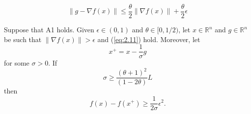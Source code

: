 \documentclass[10pt,a4paper]{amsart}
\begin{document}
\begin{equation}
\|g-\nabla f(x)\|\leq\dfrac{\theta}{2}\|\nabla f(x)\|+\dfrac{\theta}{2}\epsilon
\label{eq:2.11}
\end{equation}

\begin{lemma}
\label{lem:2.3}
Suppose that A1 holds. Given $\epsilon\in (0,1)$ and $\theta\in [0,1/2)$, let $x\in\mathbb{R}^{n}$ and $g\in\mathbb{R}^{n}$ be such that $\|\nabla f(x)\|>\epsilon$ and (\ref{eq:2.11}) hold. Moreover, let 
\begin{equation*}
x^{+}=x-\frac{1}{\sigma}g
\end{equation*}
for some $\sigma>0$. If 
\begin{equation}
\sigma\geq\dfrac{(\theta +1)^{2}}{(1-2\theta)}L
\label{eq:2.12}
\end{equation}
then
\begin{equation}
f(x)-f(x^{+})\geq\dfrac{1}{2\sigma}\epsilon^{2}.
\label{eq:2.13}
\end{equation}
\end{lemma}
\end{document}
